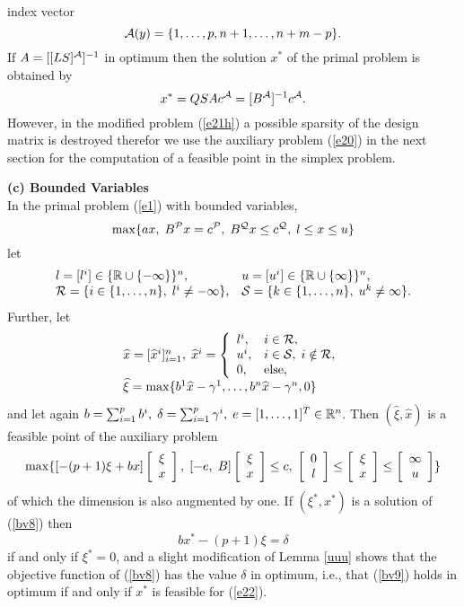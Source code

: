 index vector
\[
\A(y) = \{1,\ldots, p, n+1, \ldots,n+m-p\}.
\]
If $A = [[LS]^{\A}]^{-1}$ in optimum then the solution $x^*$ of the primal
problem is obtained by
\[
x^* = QSAc^{\A} = [B^{\A}]^{-1}c^{\A}.
\]
However, in the modified problem (\ref{e21h}) a possible sparsity of the design
matrix is destroyed therefor we use the auxiliary problem (\ref{e20}) in the
next section for the computation of a feasible point in the simplex
problem.
\par
{\bf (c) Bounded Variables} \hfill\\
In the primal problem (\ref{e1}) with bounded variables,
\begin{equation} \label{e22}
\max \{ax, \; B^{\P}x = c^{\P}, \; B^{\Q}x \leq c^{\Q}, \; l \leq x \leq u \}
\end{equation}
let
\[ \ba{.}{ll}
l = [l^i] \in \{\Bbb{R} \cup \{- \infty\}\}^n, &
u = [u^i] \in \{\Bbb{R} \cup \{\infty\}\}^n,\\
\R = \{i \in \{1,\ldots,n\}, \; l^i \neq -\infty\}, &
{\cal S} = \{k \in \{1,\ldots,n\}, \; u^k \neq \infty\}.
\ea{.}
\]
Further, let
\[ \ba{.}{l}
\widehat{x} = [\widehat{x}^i]_{i=1}^n, \;
\widehat{x}^i = \ba{\{}{ll}
l^i, & i \in \R,\\
u^i, & i \in {\cal S}, \; i \notin \R,\\
0,   & \mbox{else}, \ea{.}               \\
\widehat{\xi } = \max \{b^1 \widehat{x} - \gamma ^1,
                 \ldots, b^n\widehat{x} - \gamma ^n, 0\}
\ea{.}
\]
and let again $b = \sum_{i=1}^pb^i, \; \delta  = \sum_{i=1}^p\gamma ^i, \; e
= [1,\ldots,1]^T \in \Bbb{R}^n$. Then $(\widehat{\xi },\widehat{x})$ is a
feasible point of the auxiliary problem
%
\begin{equation} \label{bv8}
\max\{[-(p+1)\xi  + bx]\ba{[}{c}\xi \\ x\ea{]},
\;[-e, \; B]\ba{[}{c} \xi  \\ x \ea{]} \leq c, \;
\ba{[}{c}0 \\ l\ea{]} \leq \ba{[}{c}\xi  \\ x\ea{]} \leq \ba{[}{c} \infty \\
u\ea{]} \}
\end{equation}
%
of which the dimension is also augmented by one.
If $(\xi ^*,x^*)$ is a solution of (\ref{bv8}) then
\begin{equation} \label{bv9}
bx^* -(p+1)\xi  = \delta
\end{equation}
if and only if $\xi ^* = 0$, and a slight modification of Lemma \ref{uuu} shows
that the objective function of (\ref{bv8}) has the value $\delta $ in optimum,
i.e., that (\ref{bv9}) holds in optimum if and only if $x^*$ is feasible for
(\ref{e22}).
